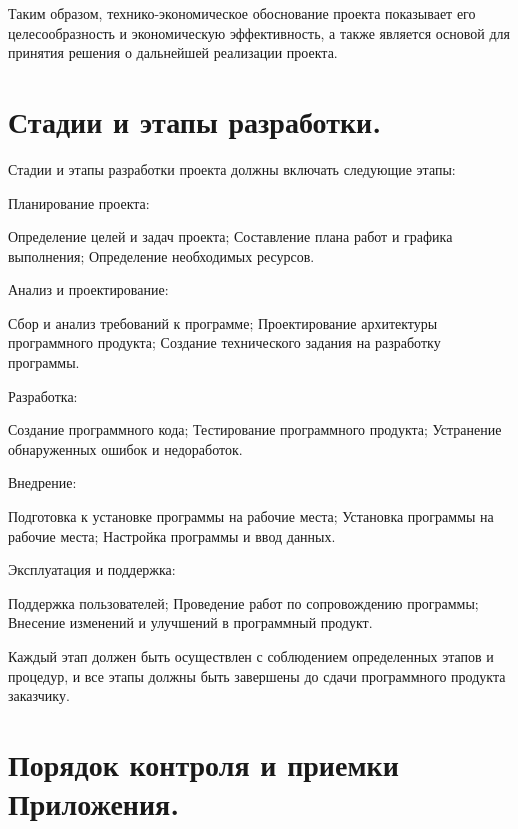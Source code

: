 Таким образом, технико-экономическое обоснование проекта показывает его целесообразность и экономическую эффективность, а также является основой для принятия решения о дальнейшей реализации проекта.







\newpage
\section{Стадии и этапы разработки.}






Стадии и этапы разработки проекта должны включать следующие этапы:

    Планирование проекта:

    Определение целей и задач проекта;
    Составление плана работ и графика выполнения;
    Определение необходимых ресурсов.

    Анализ и проектирование:

    Сбор и анализ требований к программе;
    Проектирование архитектуры программного продукта;
    Создание технического задания на разработку программы.

    Разработка:

    Создание программного кода;
    Тестирование программного продукта;
    Устранение обнаруженных ошибок и недоработок.

    Внедрение:

    Подготовка к установке программы на рабочие места;
    Установка программы на рабочие места;
    Настройка программы и ввод данных.

    Эксплуатация и поддержка:

    Поддержка пользователей;
    Проведение работ по сопровождению программы;
    Внесение изменений и улучшений в программный продукт.

Каждый этап должен быть осуществлен с соблюдением определенных этапов и процедур, и все этапы должны быть завершены до сдачи программного продукта заказчику.






\newpage
\section{Порядок контроля и приемки Приложения.}







